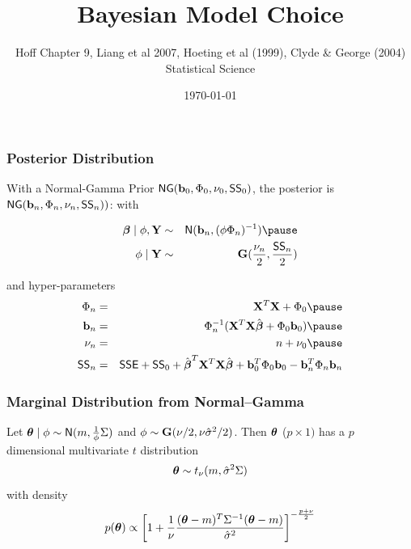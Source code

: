 \documentclass[handout]{beamer}
\title{Bayesian Model Choice}
\author{Hoff Chapter 9, Liang et al 2007, Hoeting et al (1999), Clyde \&
 George (2004) Statistical Science}
\date{\today}
\begin{document}

\maketitle


\begin{frame}
  \frametitle{Posterior Distribution}
With a Normal-Gamma Prior $\textsf{NG}(\mathbf{b}_0, \Phi_0, \nu_0, \textsf{SS}_0)$, the posterior is $\textsf{NG}(\mathbf{b}_n, \Phi_n, \nu_n, \textsf{SS}_n))$: with 

\begin{eqnarray*}
\b \mid \phi, \Y & \sim &\N(\bv_n, (\phi \Phi_n)^{-1}) \pause \\
\phi \mid \Y &\sim &\G(\frac{\nu_n}{2}, \frac{\SS_n}{2})
  \end{eqnarray*}

and hyper-parameters
  \begin{eqnarray*}
\Phi_n & = & \X^T\X +  \Phi_0 \pause \\
\bv_n  & = & \Phi_n^{-1} (\X^T\X \bhat  + \Phi_0 \bv_0) \pause \\
\nu_n & = &  n + \nu_0 \pause \\
\SS_n & = &\SSE + \SS_0 + \bhat^T \X^T\X \bhat + \bv_0^T \Phi_0 \bv_0
 - \bv_n^T \Phi_n \bv_n
  \end{eqnarray*}


\end{frame}
\begin{frame}
  \frametitle{Marginal Distribution from Normal--Gamma }
  \begin{theorem}
    Let  $\boldsymbol{\theta} \mid \phi \sim \textsf{N}(m, \frac{1}{\phi} \Sigma)$ and $\phi \sim
    \mathbf{G}(\nu/2, \nu {\hat{\sigma}}^2/2)$. Then  $\boldsymbol{\theta}$ ($p \times 1)$ has a $p$
    dimensional multivariate $t$ distribution $$\boldsymbol{\theta} \sim t_\nu( m,
    {\hat{\sigma}}^2 \Sigma )$$ with density
$$p(\boldsymbol{\theta}) \propto  \left[ 1 + \frac{1}{\nu}  \frac{ (\boldsymbol{\theta} - m)^T
    \Sigma^{-1} (\boldsymbol{\theta} - m)}{{\hat{\sigma}}^2} \right]^{- \frac{p + \nu}{2}}$$
  \end{theorem}
\end{frame}
\end{document}
